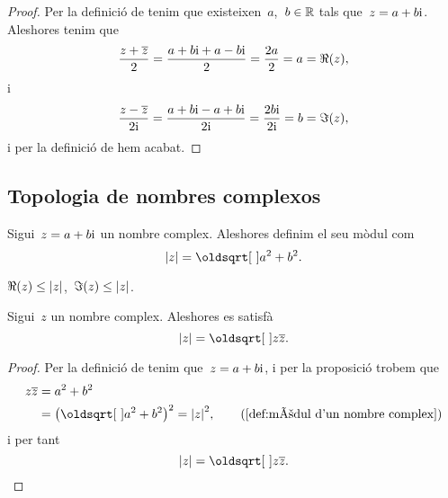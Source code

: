 \documentclass[../../main.tex]{subfiles}
\begin{document}
    \begin{proof}
        Per la definició de  tenim que
        existeixen~\(a\),~\(b\in\mathbb{R}\) tals que~\(z = a+b\mathrm{i}\).
        Aleshores tenim que
        \[
            \frac{z+\overline{z}}{2} = \frac{a+b\mathrm{i}+a-b\mathrm{i}}{2}
                                     = \frac{2a}{2} = a = \Re(z),
        \]
        i
        \[
            \frac{z-\overline{z}}{2\mathrm{i}} = \frac{a+b\mathrm{i}-a+b\mathrm{i}}{2\mathrm{i}}
                                        = \frac{2b\mathrm{i}}{2\mathrm{i}} = b = \Im(z),
        \]
        i per la definició
        de  hem
        acabat.
    \end{proof}
    \subsection{Topologia de nombres complexos}
    \begin{definition}
        \label{def:mòdul d'un nombre complex}
        Sigui~\(z = a+b\mathrm{i}\) un nombre complex.
        Aleshores definim el seu mòdul com
        \[
            \modul{z} = \sqrt{a^{2}+b^{2}}.
        \]
    \end{definition}
    \begin{observation}
        \label{obs:les parts real i imaginàries d'un complex són menors que el seu mòdul}
        \label{obs:la part real d'un complex és menor que el seu mòdul}
        \label{obs:la part imaginària d'un complex és menor que el seu mòdul}
        \(\Re(z) \leq \modul{z}\),~\(\Im(z) \leq \modul{z}\).
    \end{observation}
    \begin{proposition}
        \label{prop:el mòdul d'un nombre complex és l'arrel del nombre pel seu conjugat}
        Sigui~\(z\) un nombre complex.
        Aleshores es satisfà
        \[
            \modul{z} = \sqrt{z\conjugat{z}}.
        \]
    \end{proposition}
    \begin{proof}
        Per la definició de  tenim
        que~\(z = a+b\mathrm{i}\), i per la
        proposició 
        trobem que
        \begin{align*}
            z\conjugat{z} &= a^{2}+b^{2} \\
                          &= \big(\sqrt{a^{2}+b^{2}}\big)^{2}
                           = \modul{z}^{2},
                          \tag{\ref{def:mòdul d'un nombre complex}}
        \end{align*}
        i per tant
        \[
            \modul{z} = \sqrt{z\conjugat{z}}.\qedhere
        \]
    \end{proof}
\end{document}
